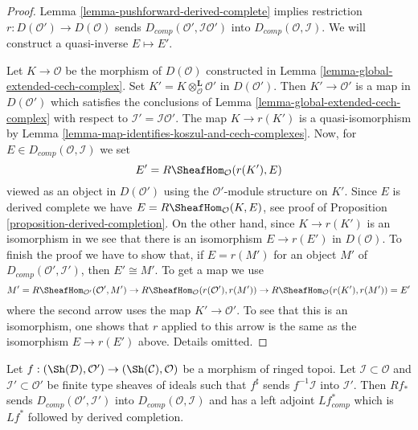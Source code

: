 \begin{proof}
Lemma \ref{lemma-pushforward-derived-complete} implies
restriction $r : D(\mathcal{O}') \to D(\mathcal{O})$
sends $D_{comp}(\mathcal{O}', \mathcal{I}\mathcal{O}')$
into $D_{comp}(\mathcal{O}, \mathcal{I})$. We will construct a
quasi-inverse $E \mapsto E'$.

\medskip\noindent
Let $K \to \mathcal{O}$ be the morphism of $D(\mathcal{O})$
constructed in Lemma \ref{lemma-global-extended-cech-complex}. 
Set $K' = K \otimes_\mathcal{O}^\mathbf{L} \mathcal{O}'$ in $D(\mathcal{O}')$.
Then $K' \to \mathcal{O}'$ is a map in $D(\mathcal{O}')$ which
satisfies the conclusions of Lemma \ref{lemma-global-extended-cech-complex}
with respect to $\mathcal{I}' = \mathcal{I}\mathcal{O}'$.
The map $K \to r(K')$ is a quasi-isomorphism by
Lemma \ref{lemma-map-identifies-koszul-and-cech-complexes}.
Now, for $E \in D_{comp}(\mathcal{O}, \mathcal{I})$ we set
$$
E' = R\SheafHom_\mathcal{O}(r(K'), E)
$$
viewed as an object in $D(\mathcal{O}')$ using the $\mathcal{O}'$-module
structure on $K'$. Since $E$ is derived complete
we have $E = R\SheafHom_\mathcal{O}(K, E)$, see
proof of Proposition \ref{proposition-derived-completion}.
On the other hand, since $K \to r(K')$ is an isomorphism in
we see that there is an isomorphism
$E \to r(E')$ in $D(\mathcal{O})$. To finish the proof we
have to show that, if $E = r(M')$ for an object $M'$ of
$D_{comp}(\mathcal{O}', \mathcal{I}')$, then
$E' \cong M'$. To get a map we use
$$
M' = R\SheafHom_{\mathcal{O}'}(\mathcal{O}', M') \to
R\SheafHom_\mathcal{O}(r(\mathcal{O}'), r(M')) \to
R\SheafHom_\mathcal{O}(r(K'), r(M')) = E'
$$
where the second arrow uses the map $K' \to \mathcal{O}'$.
To see that this is an isomorphism, one shows that $r$ applied
to this arrow is the same as the isomorphism $E \to r(E')$ above.
Details omitted.
\end{proof}

\begin{lemma}
\label{lemma-pushforward-derived-complete-adjoint}
Let $f : (\Sh(\mathcal{D}), \mathcal{O}') \to (\Sh(\mathcal{C}), \mathcal{O})$
be a morphism of ringed topoi. Let $\mathcal{I} \subset \mathcal{O}$
and $\mathcal{I}' \subset \mathcal{O}'$ 
be finite type sheaves of ideals such that $f^\sharp$ sends
$f^{-1}\mathcal{I}$ into $\mathcal{I}'$.
Then $Rf_*$ sends $D_{comp}(\mathcal{O}', \mathcal{I}')$
into $D_{comp}(\mathcal{O}, \mathcal{I})$ and has a left adjoint
$Lf_{comp}^*$ which is $Lf^*$ followed by derived completion.
\end{lemma}

